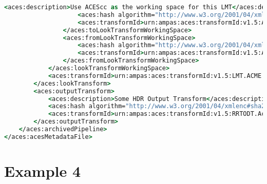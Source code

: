 \begin{lstlisting}[language=csh]
                    <aces:description>Use ACEScc as the working space for this LMT</aces:description>
                    <aces:hash algorithm="http://www.w3.org/2001/04/xmlenc#sha256">07eb8b020fe8fc10c8c4b983cc37798324c7eee1319f07dd0028fca96f904a7f</aces:hash>
                    <aces:transformId>urn:ampas:aces:transformId:v1.5:ACEScsc.ACME.ACES_to_MyCustomLogSpace.a1.v1</aces:transformId>
                </aces:toLookTransformWorkingSpace>
                <aces:fromLookTransformWorkingSpace>
                    <aces:hash algorithm="http://www.w3.org/2001/04/xmlenc#sha256">ef461a45beded2c5204371f755ca2558e61743f288f3ccd719ce1de23ebcf9cb</aces:hash>
                    <aces:transformId>urn:ampas:aces:transformId:v1.5:ACEScsc.ACME.MyCustomLogSpace_to_ACES.a1.v1</aces:transformId>
                </aces:fromLookTransformWorkingSpace>
            </aces:lookTransformWorkingSpace>
            <aces:transformId>urn:ampas:aces:transformId:v1.5:LMT.ACME.AcmeDILook.a1.v5</aces:transformId>
        </aces:lookTransform>
        <aces:outputTransform>
            <aces:description>Some HDR Output Transform</aces:description>
            <aces:hash algorithm="http://www.w3.org/2001/04/xmlenc#sha256">9ffcd28772e244f9a3c6e9893f499f2b4f2f3313d292db51aeea4fd3f65f00d9</aces:hash>
            <aces:transformId>urn:ampas:aces:transformId:v1.5:RRTODT.Acme.HDRODT.a1.v3</aces:transformId>
        </aces:outputTransform>
    </aces:archivedPipeline>
</aces:acesMetadataFile>
\end{lstlisting}

\newpage
\section*{Example 4}

